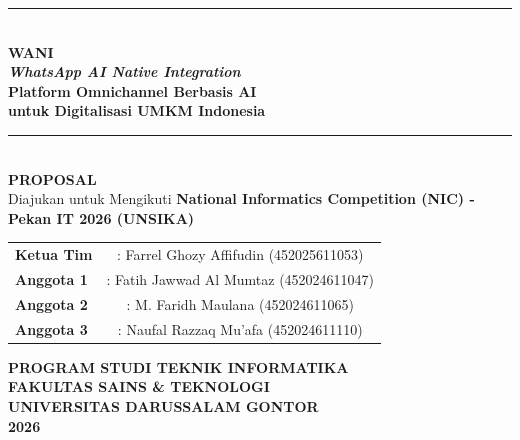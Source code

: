 \documentclass[12pt,a4paper,oneside]{article}
\begin{document}
\begin{titlepage}
	\centering

	\vspace*{1cm}

	{\color{primary}\rule{0.7\textwidth}{1.5pt}}\\[1.5em]
	{\LARGE\bfseries\color{dark}
	WANI\\[0.3em]
	{\large\textit{WhatsApp AI Native Integration}}\\[1.2em]
	}
	{\Large\bfseries\color{primary}
	Platform Omnichannel Berbasis AI\\[0.2em]
	untuk Digitalisasi UMKM Indonesia\\[1.5em]
	}
	{\color{primary}\rule{0.7\textwidth}{1.5pt}}\\[2em]

	{\large\bfseries PROPOSAL}\\[0.5em]
	{\large Diajukan untuk Mengikuti \textbf{National Informatics Competition (NIC) - Pekan IT 2026 (UNSIKA)}}\\[3em]

	\begin{tabular}{lc}
		\textbf{Ketua Tim} & : Farrel Ghozy Affifudin \quad (452025611053) \\[0.6ex]
		\textbf{Anggota 1} & : Fatih Jawwad Al Mumtaz \quad (452024611047) \\[0.6ex]
		\textbf{Anggota 2} & : M. Faridh Maulana \quad (452024611065)      \\[0.6ex]
		\textbf{Anggota 3} & : Naufal Razzaq Mu'afa \quad (452024611110)   \\[0.6ex]
	\end{tabular}

	\vfill

	\textbf{PROGRAM STUDI TEKNIK INFORMATIKA}\\[0.3ex]
	\textbf{FAKULTAS SAINS \& TEKNOLOGI}\\[0.3ex]
	\textbf{UNIVERSITAS DARUSSALAM GONTOR}\\[0.3ex]
	\textbf{2026}
\end{titlepage}

\newpage
\tableofcontents
\newpage

\listoftables
\newpage
\end{document}
